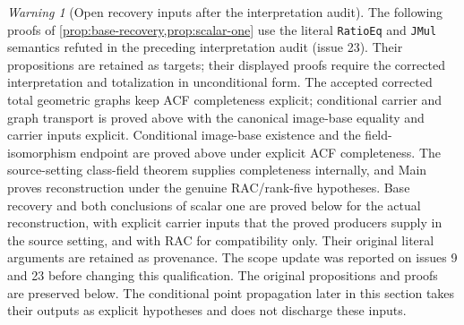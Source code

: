 \documentclass[11pt,oneside]{article}
\theoremstyle{definition}
\theoremstyle{remark}
\newtheorem{warning}[theorem]{Warning}
\newcommand{\lean}[1]{\nolinkurl{#1}}
\begin{document}
\begin{warning}[Open recovery inputs after the interpretation audit]
\label{warn:recovery-inputs}
The following proofs of \cref{prop:base-recovery,prop:scalar-one} use the literal
\lean{RatioEq} and \lean{JMul} semantics refuted in the preceding interpretation
audit (issue 23). Their propositions are retained as targets; their displayed
proofs require the corrected interpretation and totalization in unconditional form.
The accepted corrected total geometric graphs keep ACF completeness explicit;
conditional carrier and graph transport is proved above with the canonical image-base
equality and carrier inputs explicit. Conditional image-base existence and the field-isomorphism
endpoint are proved above under explicit ACF completeness. The source-setting class-field
theorem supplies completeness internally, and Main proves reconstruction under the genuine
RAC/rank-five hypotheses. Base recovery and both conclusions of scalar one are proved
below for the actual reconstruction, with explicit carrier inputs that the proved producers
supply in the source setting, and with RAC for compatibility only. Their original literal
arguments are retained as provenance.
The scope update was reported on issues 9 and 23 before changing this qualification.
The original propositions and proofs are preserved below.
The conditional point propagation later in this section takes their outputs as
explicit hypotheses and does not discharge these inputs.
\end{warning}
\end{document}
